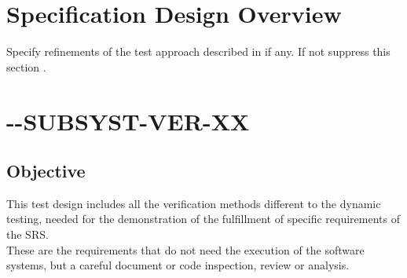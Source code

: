 \documentclass[CUx,lsstdraft,STS]{lsstdoc}
\begin{document}
\newpage




\section{Specification Design Overview \label{sect:design}}
Specify refinements of the test approach described in  if any.
If not suppress this section .

\section{\CU-\product-SUBSYST-VER-XX \label{sect:designid_verification}}

\subsection{Objective \label{sect:designobj}}
This test design includes all the verification methods different to the dynamic testing, needed for the
demonstration of the fulfillment of specific requirements of the SRS.\\
These are the requirements that do not need the execution of the software systems, but a careful document or code inspection, review
or analysis.
\end{document}
